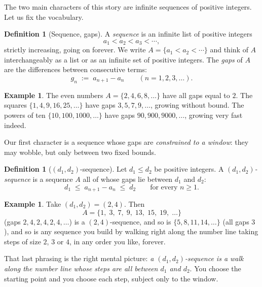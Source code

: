 \documentclass[11pt,reqno]{amsart}
\theoremstyle{plain}
\theoremstyle{definition}
\newtheorem{definition}[theorem]{Definition}
\newtheorem{example}[theorem]{Example}
\theoremstyle{remark}
\begin{document}
The two main characters of this story are infinite sequences of positive integers. Let
us fix the vocabulary.

\begin{definition}[Sequence, gaps]\label{def:sequence}
A \emph{sequence} is an infinite list of positive integers
\[
  a_1 < a_2 < a_3 < \cdots,
\]
strictly increasing, going on forever. We write $A = \{a_1 < a_2 < \cdots\}$ and think
of $A$ interchangeably as a list or as an infinite set of positive integers. The
\emph{gaps} of $A$ are the differences between consecutive terms:
\[
  g_n \;:=\; a_{n+1} - a_n \qquad (n = 1, 2, 3, \dots).
\]
\end{definition}

\begin{example}
The even numbers $A = \{2, 4, 6, 8, \dots\}$ have all gaps equal to $2$. The squares
$\{1, 4, 9, 16, 25, \dots\}$ have gaps $3, 5, 7, 9, \dots$, growing without bound. The
powers of ten $\{10, 100, 1000, \dots\}$ have gaps $90, 900, 9000, \dots$, growing very
fast indeed.
\end{example}

Our first character is a sequence whose gaps are \emph{constrained to a window}: they
may wobble, but only between two fixed bounds.

\begin{definition}[$(d_1,d_2)$-sequence]\label{def:d1d2}
Let $d_1 \le d_2$ be positive integers. A \emph{$(d_1,d_2)$-sequence} is a sequence $A$
all of whose gaps lie between $d_1$ and $d_2$:
\[
  d_1 \;\le\; a_{n+1} - a_n \;\le\; d_2 \qquad \text{for every } n \ge 1.
\]
\end{definition}

\begin{example}\label{ex:24seq}
Take $(d_1, d_2) = (2, 4)$. Then
\[
  A = \{1,\; 3,\; 7,\; 9,\; 13,\; 15,\; 19,\; \dots\}
\]
(gaps $2, 4, 2, 4, 2, 4, \dots$) is a $(2,4)$-sequence, and so is
$\{5, 8, 11, 14, \dots\}$ (all gaps $3$), and so is any sequence you build by walking
right along the number line taking steps of size $2$, $3$ or $4$, in any order you
like, forever.
\end{example}

That last phrasing is the right mental picture: \emph{a $(d_1,d_2)$-sequence is a walk
along the number line whose steps are all between $d_1$ and $d_2$}. You choose the
starting point and you choose each step, subject only to the window.

\begin{center}
\end{center}
\end{document}

